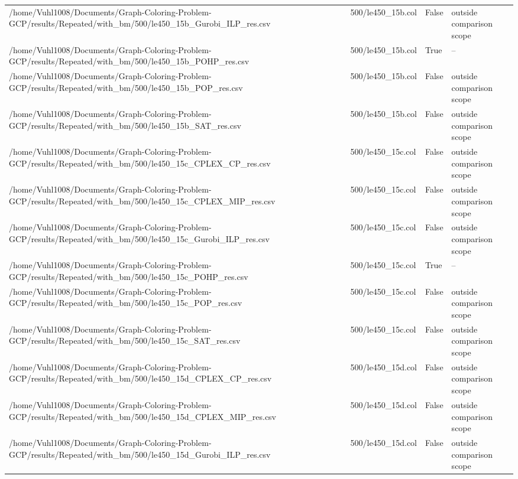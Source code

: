\begin{table}[htbp]
\begin{tabular}{llll}
/home/Vuhl1008/Documents/Graph-Coloring-Problem-GCP/results/Repeated/with\_bm/500/le450\_15b\_Gurobi\_ILP\_res.csv & 500/le450\_15b.col & False & outside comparison scope \\
/home/Vuhl1008/Documents/Graph-Coloring-Problem-GCP/results/Repeated/with\_bm/500/le450\_15b\_POHP\_res.csv & 500/le450\_15b.col & True & -- \\
/home/Vuhl1008/Documents/Graph-Coloring-Problem-GCP/results/Repeated/with\_bm/500/le450\_15b\_POP\_res.csv & 500/le450\_15b.col & False & outside comparison scope \\
/home/Vuhl1008/Documents/Graph-Coloring-Problem-GCP/results/Repeated/with\_bm/500/le450\_15b\_SAT\_res.csv & 500/le450\_15b.col & False & outside comparison scope \\
/home/Vuhl1008/Documents/Graph-Coloring-Problem-GCP/results/Repeated/with\_bm/500/le450\_15c\_CPLEX\_CP\_res.csv & 500/le450\_15c.col & False & outside comparison scope \\
/home/Vuhl1008/Documents/Graph-Coloring-Problem-GCP/results/Repeated/with\_bm/500/le450\_15c\_CPLEX\_MIP\_res.csv & 500/le450\_15c.col & False & outside comparison scope \\
/home/Vuhl1008/Documents/Graph-Coloring-Problem-GCP/results/Repeated/with\_bm/500/le450\_15c\_Gurobi\_ILP\_res.csv & 500/le450\_15c.col & False & outside comparison scope \\
/home/Vuhl1008/Documents/Graph-Coloring-Problem-GCP/results/Repeated/with\_bm/500/le450\_15c\_POHP\_res.csv & 500/le450\_15c.col & True & -- \\
/home/Vuhl1008/Documents/Graph-Coloring-Problem-GCP/results/Repeated/with\_bm/500/le450\_15c\_POP\_res.csv & 500/le450\_15c.col & False & outside comparison scope \\
/home/Vuhl1008/Documents/Graph-Coloring-Problem-GCP/results/Repeated/with\_bm/500/le450\_15c\_SAT\_res.csv & 500/le450\_15c.col & False & outside comparison scope \\
/home/Vuhl1008/Documents/Graph-Coloring-Problem-GCP/results/Repeated/with\_bm/500/le450\_15d\_CPLEX\_CP\_res.csv & 500/le450\_15d.col & False & outside comparison scope \\
/home/Vuhl1008/Documents/Graph-Coloring-Problem-GCP/results/Repeated/with\_bm/500/le450\_15d\_CPLEX\_MIP\_res.csv & 500/le450\_15d.col & False & outside comparison scope \\
/home/Vuhl1008/Documents/Graph-Coloring-Problem-GCP/results/Repeated/with\_bm/500/le450\_15d\_Gurobi\_ILP\_res.csv & 500/le450\_15d.col & False & outside comparison scope \\

\end{tabular}
\end{table}
